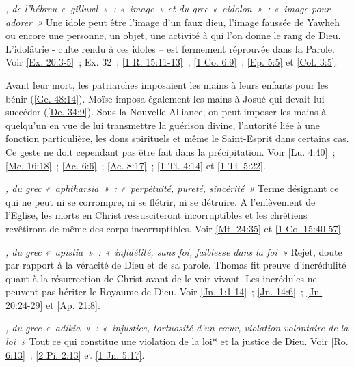 \begin{multicols}{2}
\textit{, de l'hébreu «~gilluwl~»~: «~image~» et du grec «~eidolon~»~: «~image pour adorer~»}\newline
Une idole peut être l'image d'un faux dieu, l'image faussée de Yawheh ou encore une personne, un objet, une activité à qui l'on donne le rang de Dieu. L'idolâtrie - culte rendu à ces idoles – est fermement réprouvée dans la Parole. Voir \vref{Ex. 20:3-5}~; Ex. 32~; \vref{1 R. 15:11-13}~; \vref{1 Co. 6:9}~; \vref{Ep. 5:5} et \vref{Col. 3:5}.

\textit{}\newline
Avant leur mort, les patriarches imposaient les mains à leurs enfants pour les bénir (\vref{Ge. 48:14}). Moïse imposa également les mains à Josué qui devait lui succéder (\vref{De. 34:9}). Sous la Nouvelle Alliance, on peut imposer les mains à quelqu'un en vue de lui transmettre la guérison divine, l'autorité liée à une fonction particulière, les dons spirituels et même le Saint-Esprit dans certains cas. Ce geste ne doit cependant pas être fait dans la précipitation.\newline
Voir \vref{Lu. 4:40}~; \vref{Mc. 16:18}~; \vref{Ac. 6:6}~; \vref{Ac. 8:17}~; \vref{1 Ti. 4:14} et \vref{1 Ti. 5:22}.

\textit{, du grec «~aphtharsia~»~: «~perpétuité, pureté, sincérité~»}\newline
Terme désignant ce qui ne peut ni se corrompre, ni se flétrir, ni se détruire. A l'enlèvement de l'Eglise, les morts en Christ ressusciteront incorruptibles et les chrétiens revêtiront de même des corps incorruptibles.\newline
Voir \vref{Mt. 24:35} et \vref{1 Co. 15:40-57}.

\textit{, du grec «~apistia~»~: «~infidélité, sans foi, faiblesse dans la foi~»}\newline
Rejet, doute par rapport à la véracité de Dieu et de sa parole. Thomas fit preuve d'incrédulité quant à la résurrection de Christ avant de le voir vivant. Les incrédules ne peuvent pas hériter le Royaume de Dieu.\newline
Voir \vref{Jn. 1:1-14}~; \vref{Jn. 14:6}~; \vref{Jn. 20:24-29} et \vref{Ap. 21:8}.

\textit{, du grec «~adikia~»~: «~injustice, tortuosité d'un cœur, violation volontaire de la loi~»}\newline
Tout ce qui constitue une violation de la loi* et la justice de Dieu.\newline
Voir \vref{Ro. 6:13}~; \vref{2 Pi. 2:13} et \vref{1 Jn. 5:17}.


\end{multicols}
